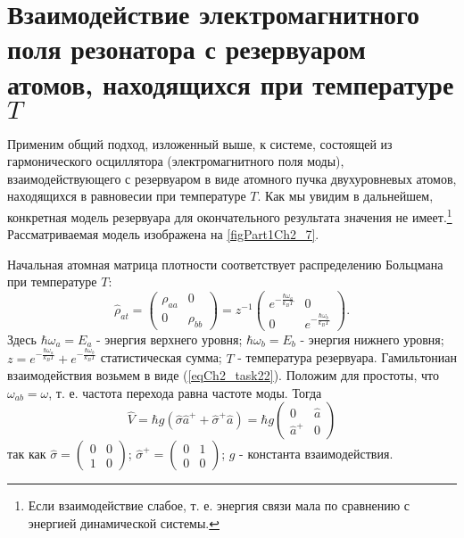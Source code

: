 \section{Взаимодействие электромагнитного поля резонатора
  с резервуаром атомов, находящихся при
  температуре $T$}
\label{ch2_6}
Применим общий подход, изложенный выше, к системе, состоящей из
гармонического осциллятора (электромагнитного поля моды),
взаимодействующего с резервуаром в виде атомного пучка двухуровневых
атомов, находящихся в равновесии при температуре $T$.  Как мы увидим
в дальнейшем, конкретная модель резервуара для окончательного
результата значения не имеет.\footnote{Если взаимодействие слабое,
  т. е. энергия связи мала по сравнению с энергией динамической системы.} 
Рассматриваемая модель изображена на
\autoref{figPart1Ch2_7}.  



Начальная атомная матрица плотности соответствует распределению
Больцмана при температуре $T$:  
\begin{equation}
\hat{\rho}_{at} = 
\left(
\begin{array} {cc}
\rho_{aa} & 0  
\\
0 & \rho_{bb} 
\end{array}
\right)
=
z^{-1}
\left(
\begin{array} {cc}
e^{-\frac{\hbar \omega_a}{k_B T}} & 0  
\\
0 & e^{-\frac{\hbar \omega_b}{k_B T}} 
\end{array}
\right).
\end{equation}
Здесь $\hbar \omega_a = E_a$ - энергия верхнего уровня;  
$\hbar \omega_b = E_b$ - энергия нижнего уровня; 
$z = e^{-\frac{\hbar \omega_a}{k_B T}} + e^{-\frac{\hbar \omega_b}{k_B
    T}}$ статистическая сумма; $T$ - температура резервуара. 
Гамильтониан взаимодействия возьмем в виде
(\ref{eqCh2_task22}). Положим для простоты, 
что $\omega_{ab} = \omega$,  т. е. частота перехода равна частоте 
моды. Тогда  
\begin{equation}
\hat{V} = \hbar g \left(\hat{\sigma}\hat{a}^{+} + 
\hat{\sigma}^{+}\hat{a} \right)= 
\hbar g 
\left(
\begin{array} {cc}
0 & \hat{a}  
\\
\hat{a}^{+} & 0 
\end{array}
\right)
\end{equation}
так как  
\(
\hat{\sigma} = 
\left(
\begin{array} {cc}
0 & 0  
\\
1 & 0 
\end{array}
\right)
\);
\(
\hat{\sigma}^{+} = 
\left(
\begin{array} {cc}
0 & 1  
\\
0 & 0 
\end{array}
\right)
\); $g$ - константа взаимодействия. 

